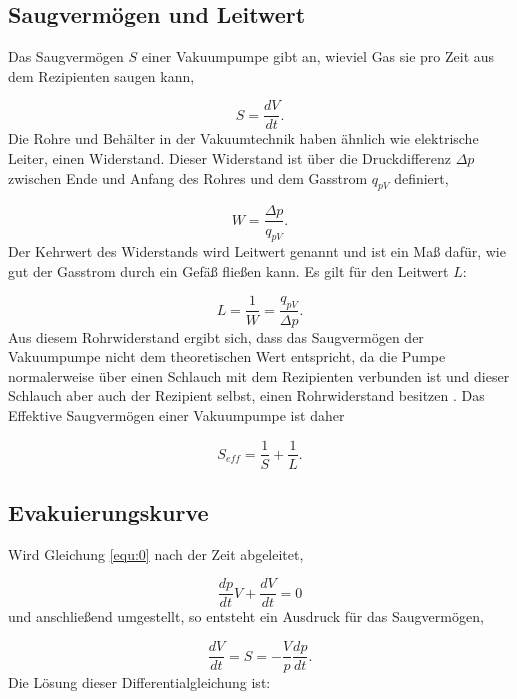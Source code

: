 \subsection{Saugvermögen und Leitwert}
\label{sec:Saugvermögen}
Das Saugvermögen $S$ einer Vakuumpumpe gibt an, wieviel Gas sie pro Zeit aus dem Rezipienten saugen kann,

    \begin{equation}
    \label{equ:4}
        S = \frac{dV}{dt}.
    \end{equation}
Die Rohre und Behälter in der Vakuumtechnik haben ähnlich wie elektrische Leiter, einen Widerstand.
Dieser Widerstand ist über die Druckdifferenz $\Delta p$ zwischen Ende und Anfang des Rohres und dem Gasstrom $q_{pV}$ definiert,

    \begin{equation}
    \label{equ:5}
        W = \frac{\Delta p}{q_{pV}}.
    \end{equation}
Der Kehrwert des Widerstands wird Leitwert genannt und ist ein Maß dafür, wie gut der Gasstrom durch ein Gefäß fließen kann.
Es gilt für den Leitwert $L$:

    \begin{equation}
    \label{equ:6}
        L = \frac{1}{W} = \frac{q_{pV}}{\Delta p}.
    \end{equation}
Aus diesem Rohrwiderstand ergibt sich, dass das Saugvermögen der Vakuumpumpe nicht dem theoretischen Wert entspricht, 
da die Pumpe normalerweise über einen Schlauch mit dem Rezipienten verbunden ist und dieser Schlauch aber auch der Rezipient selbst, 
einen Rohrwiderstand besitzen \cite{Buch, S.82}.
Das Effektive Saugvermögen einer Vakuumpumpe ist daher

    \begin{equation}
    \label{equ:9}
        S_{eff} = \frac{1}{S} + \frac{1}{L}.
    \end{equation}


\subsection{Evakuierungskurve}
Wird Gleichung \eqref{equ:0} nach der Zeit abgeleitet, 

    \begin{equation}
    \label{equ:10}
        \frac{dp}{dt} V + \frac{dV}{dt} = 0
    \end{equation}
und anschließend umgestellt, so entsteht ein Ausdruck für das Saugvermögen,

    \begin{equation}
    \label{equ:11}
        \frac{dV}{dt} = S = - \frac{V}{p} \frac{dp}{dt}.
    \end{equation}
Die Lösung dieser Differentialgleichung ist:

